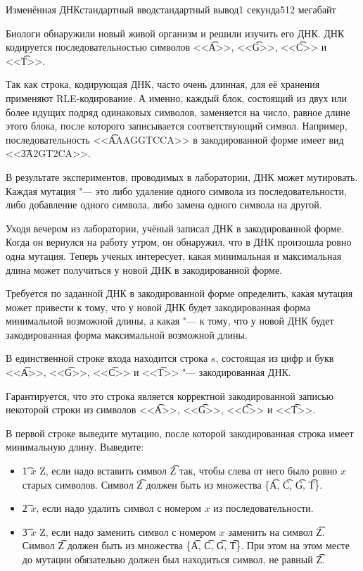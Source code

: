 \begin{problem}{Изменённая ДНК}{стандартный ввод}{стандартный вывод}{1 секунда}{512 мегабайт}

Биологи обнаружили новый живой организм и решили изучить его ДНК. ДНК кодируется последовательностью символов <<\t{A}>>, <<\t{G}>>, <<\t{C}>> и <<\t{T}>>. 

Так как строка, кодирующая ДНК, часто очень длинная, для её хранения применяют RLE-кодирование. А именно, каждый блок, состоящий из двух или более идущих подряд одинаковых символов, заменяется на число, равное длине этого блока, после которого записывается соответствующий символ. Например, последовательность <<\t{AAAGGTCCA}>> в закодированной форме имеет вид <<\t{3A2GT2CA}>>.

В результате экспериментов, проводимых в лаборатории, ДНК может мутировать. Каждая мутация "--- это либо удаление одного символа из последовательности, либо добавление одного символа, либо замена одного символа на другой.

Уходя вечером из лаборатории, учёный записал ДНК в закодированной форме. Когда он вернулся на работу утром, он обнаружил, что в ДНК произошла ровно одна мутация. Теперь ученых интересует, какая минимальная и максимальная длина может получиться у новой ДНК в закодированной форме.

Требуется по заданной ДНК в закодированной форме определить, какая мутация может привести к тому, что у новой ДНК будет закодированная форма минимальной возможной длины, а какая "--- к тому, что у новой ДНК будет закодированная форма максимальной возможной длины.

\InputFile
В единственной строке входа находится строка $s$, состоящая из цифр и букв 
<<\t{A}>>, <<\t{G}>>, <<\t{C}>> и <<\t{T}>> "--- закодированная ДНК. 

Гарантируется, что это строка является корректной закодированной записью некоторой строки из символов <<\t{A}>>, <<\t{G}>>, <<\t{C}>> и <<\t{T}>>.

\OutputFile
В первой строке выведите мутацию, после которой закодированная строка имеет минимальную длину. Выведите:
\begin{itemize}[noitemsep,leftmargin=2cm]
\item \t{1 $x$ Z},  если надо вставить символ \t{Z} так, чтобы слева от него было ровно $x$ старых символов. Символ \t{Z} должен быть из множества \{\t{A}, \t{C}, \t{G}, \t{T}\}.
\item \t{2 $x$}, если надо удалить символ с номером $x$ из последовательности.
\item \t{3 $x$ Z}, если надо заменить символ с номером $x$ заменить на символ \t{Z}. Символ \t{Z} должен быть из множества \{\t{A}, \t{C}, \t{G}, \t{T}\}. При этом на этом месте до мутации обязательно должен был находиться символ, не равный \t{Z}. 
\end{itemize}


\end{problem}

